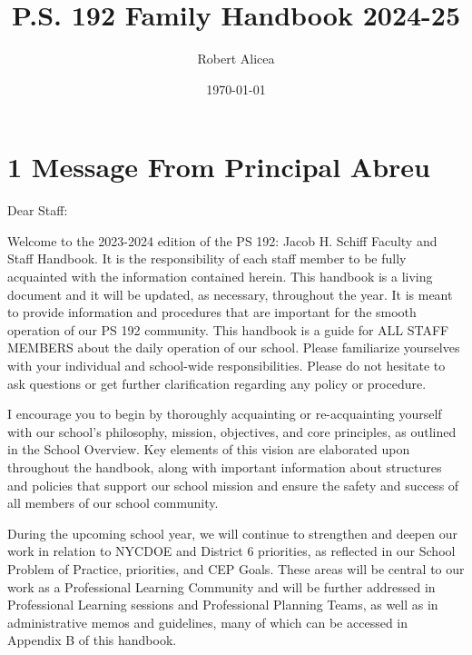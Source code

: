 \documentclass[11pt]{article}
\author{Robert Alicea}
\date{\today}
\title{P.S. 192 Family Handbook 2024-25}
\begin{document}


\pagenumbering{\fancyhf{}}
\pagestyle{headings}

\fancyhead[R]{\thepage}

\pagestyle{fancy}
\renewcommand{\footrulewidth}{1px}


\clearpage
\clearpage \tableofcontents \clearpage

\section{1 Message From Principal Abreu}
\label{sec:orgb8a5b73}

Dear Staff:

Welcome to the 2023-2024 edition of the PS 192: Jacob H. Schiff Faculty and Staff Handbook. It is the responsibility of each staff member to be fully acquainted with the information contained herein. This handbook is a living document and it will be updated, as necessary, throughout the year. It is meant to provide information and procedures that are important for the smooth operation of our PS 192 community. This handbook is a guide for ALL STAFF MEMBERS about the daily operation of our school. Please familiarize yourselves with your individual and school-wide responsibilities. Please do not hesitate to ask questions or get further clarification regarding any policy or procedure.

I encourage you to begin by thoroughly acquainting or re-acquainting yourself with our school’s philosophy, mission, objectives, and core principles, as outlined in the School Overview. Key elements of this vision are elaborated upon throughout the handbook, along with important information about structures and policies that support our school mission and ensure the safety and success of all members of our school community.

During the upcoming school year, we will continue to strengthen and deepen our work in relation to NYCDOE and District 6 priorities, as reflected in our School Problem of Practice, priorities, and CEP Goals. These areas will be central to our work as a Professional Learning Community and will be further addressed in Professional Learning sessions and Professional Planning Teams, as well as in administrative memos and guidelines, many of which can be accessed in Appendix B of this handbook.
\end{document}
